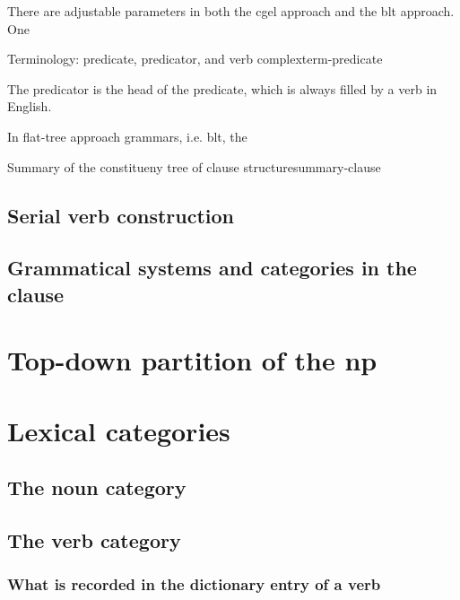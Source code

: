 \documentclass{article}
\begin{document}
There are adjustable parameters in both the \ac{cgel} approach and the \ac{blt} approach.
One 

\begin{infobox}{Terminology: predicate, predicator, and verb complex}{term-predicate}
    
    The predicator is the head of the predicate, which is always filled by a verb in English.

    In flat-tree approach grammars, i.e. \ac{blt}, 
    the 
\end{infobox}

\begin{infobox}{Summary of the constitueny tree of clause structure}{summary-clause}
    
\end{infobox}

\subsection{Serial verb construction}\label{sec:serial-verb-construction}

\subsection{Grammatical systems and categories in the clause}

\section{Top-down partition of the \acl{np}}

\section{Lexical categories}

\subsection{The noun category}

\subsection{The verb category}

\subsubsection{What is recorded in the dictionary entry of a verb}
\end{document}
